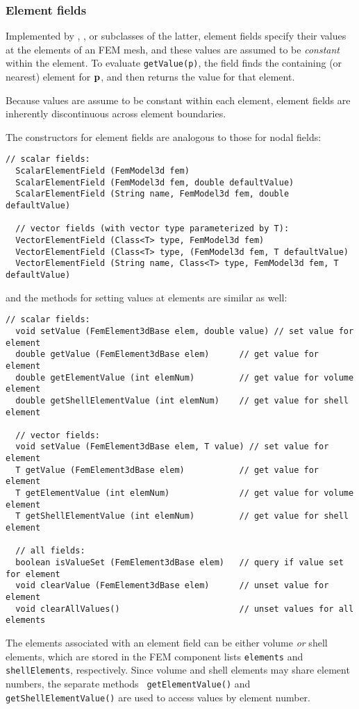 \subsubsection{Element fields}

Implemented by
,
, 
or subclasses of the latter, element fields specify their values at
the elements of an FEM mesh, and these values are assumed to be {\it
constant} within the element. To evaluate {\tt getValue(p)}, the field
finds the containing (or nearest) element for ${\bf p}$, and then returns
the value for that element.

\begin{sideblock}
Because values are assume to be constant within each element, element
fields are inherently discontinuous across element boundaries.
\end{sideblock}

The constructors for element fields are analogous to those
for nodal fields:
%
\begin{lstlisting}[]
  // scalar fields:
  ScalarElementField (FemModel3d fem)
  ScalarElementField (FemModel3d fem, double defaultValue)
  ScalarElementField (String name, FemModel3d fem, double defaultValue)

  // vector fields (with vector type parameterized by T):
  VectorElementField (Class<T> type, FemModel3d fem)
  VectorElementField (Class<T> type, (FemModel3d fem, T defaultValue)
  VectorElementField (String name, Class<T> type, FemModel3d fem, T defaultValue)
\end{lstlisting}
%
and the methods for setting values at elements are similar as
well:
%
\begin{lstlisting}[]
  // scalar fields:
  void setValue (FemElement3dBase elem, double value) // set value for element
  double getValue (FemElement3dBase elem)      // get value for element
  double getElementValue (int elemNum)         // get value for volume element
  double getShellElementValue (int elemNum)    // get value for shell element

  // vector fields:
  void setValue (FemElement3dBase elem, T value) // set value for element
  T getValue (FemElement3dBase elem)           // get value for element
  T getElementValue (int elemNum)              // get value for volume element
  T getShellElementValue (int elemNum)         // get value for shell element

  // all fields:
  boolean isValueSet (FemElement3dBase elem)   // query if value set for element
  void clearValue (FemElement3dBase elem)      // unset value for element
  void clearAllValues()                        // unset values for all elements
\end{lstlisting}
%
The elements associated with an element field can be either volume
{\it or} shell elements, which are stored in the FEM component lists
{\tt elements} and {\tt shellElements}, respectively. Since volume and
shell elements may share element numbers, the separate methods {\tt
getElementValue()} and {\tt getShellElementValue()} are used to access
values by element number.

